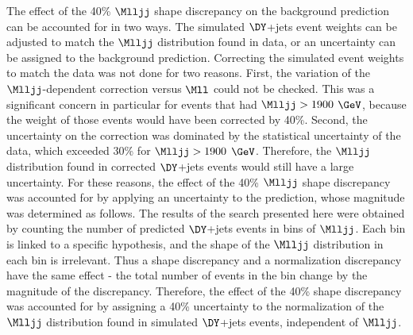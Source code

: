 The effect of the 40\% $\Mlljj$ shape discrepancy on the \DY background prediction can be accounted for in two ways.  The simulated $\DY$+jets 
event weights can be adjusted to match the $\Mlljj$ distribution found in data, or an uncertainty can be assigned to the \DY background 
prediction.  Correcting the simulated 
event weights to match the data was not done for two reasons.  First, the variation of the $\Mlljj$-dependent correction versus $\Mll$ could 
not be checked.  This was a significant concern in particular for events that had $\Mlljj > 1900$ $\GeV$, because the weight of those 
events would have been corrected by 40\%.  Second, the uncertainty on the correction was dominated by the statistical uncertainty of the data, 
which exceeded 30\% for $\Mlljj > 1900$ $\GeV$.  Therefore, the $\Mlljj$ distribution found in corrected $\DY$+jets events would still have a 
large uncertainty.  For these reasons, the effect of the 40\% $\Mlljj$ shape discrepancy was accounted for by applying an uncertainty to the 
\DY prediction, whose magnitude was determined as follows.  The results of the search presented here were obtained by counting 
the number of predicted $\DY$+jets events in bins of $\Mlljj$.  Each bin is linked to a specific \mWR hypothesis, and the shape of the \DY 
$\Mlljj$ distribution in each bin is irrelevant.  Thus a shape discrepancy and a normalization discrepancy have the same effect - the total 
number of events in the bin change by the magnitude of the discrepancy.  Therefore, the effect of the 40\% shape discrepancy was accounted for 
by assigning a 40\% uncertainty to the normalization of the $\Mlljj$ distribution found in simulated $\DY$+jets events, independent of $\Mlljj$.

